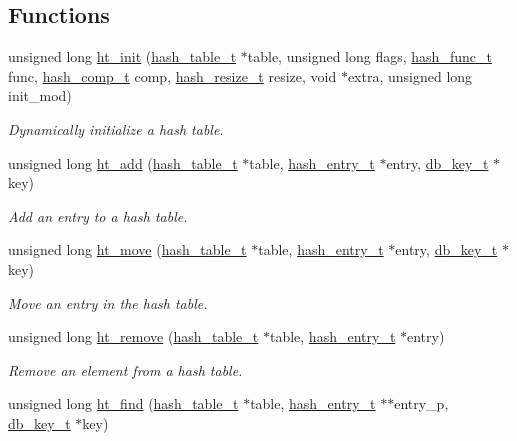 \subsection*{Functions}
\begin{CompactItemize}
\item 
unsigned long \hyperlink{group__dbprim__hash_a6}{ht\_\-init} (\hyperlink{dbprim_8h_a0}{hash\_\-table\_\-t} $\ast$table, unsigned long flags, \hyperlink{dbprim_8h_a3}{hash\_\-func\_\-t} func, \hyperlink{dbprim_8h_a4}{hash\_\-comp\_\-t} comp, \hyperlink{dbprim_8h_a5}{hash\_\-resize\_\-t} resize, void $\ast$extra, unsigned long init\_\-mod)
\begin{CompactList}\small\item\em Dynamically initialize a hash table. \item\end{CompactList}\item 
unsigned long \hyperlink{group__dbprim__hash_a7}{ht\_\-add} (\hyperlink{dbprim_8h_a0}{hash\_\-table\_\-t} $\ast$table, \hyperlink{dbprim_8h_a1}{hash\_\-entry\_\-t} $\ast$entry, \hyperlink{dbprim_8h_a0}{db\_\-key\_\-t} $\ast$key)
\begin{CompactList}\small\item\em Add an entry to a hash table. \item\end{CompactList}\item 
unsigned long \hyperlink{group__dbprim__hash_a8}{ht\_\-move} (\hyperlink{dbprim_8h_a0}{hash\_\-table\_\-t} $\ast$table, \hyperlink{dbprim_8h_a1}{hash\_\-entry\_\-t} $\ast$entry, \hyperlink{dbprim_8h_a0}{db\_\-key\_\-t} $\ast$key)
\begin{CompactList}\small\item\em Move an entry in the hash table. \item\end{CompactList}\item 
unsigned long \hyperlink{group__dbprim__hash_a9}{ht\_\-remove} (\hyperlink{dbprim_8h_a0}{hash\_\-table\_\-t} $\ast$table, \hyperlink{dbprim_8h_a1}{hash\_\-entry\_\-t} $\ast$entry)
\begin{CompactList}\small\item\em Remove an element from a hash table. \item\end{CompactList}\item 
unsigned long \hyperlink{group__dbprim__hash_a10}{ht\_\-find} (\hyperlink{dbprim_8h_a0}{hash\_\-table\_\-t} $\ast$table, \hyperlink{dbprim_8h_a1}{hash\_\-entry\_\-t} $\ast$$\ast$entry\_\-p, \hyperlink{dbprim_8h_a0}{db\_\-key\_\-t} $\ast$key)
$$
\end{CompactItemize}
